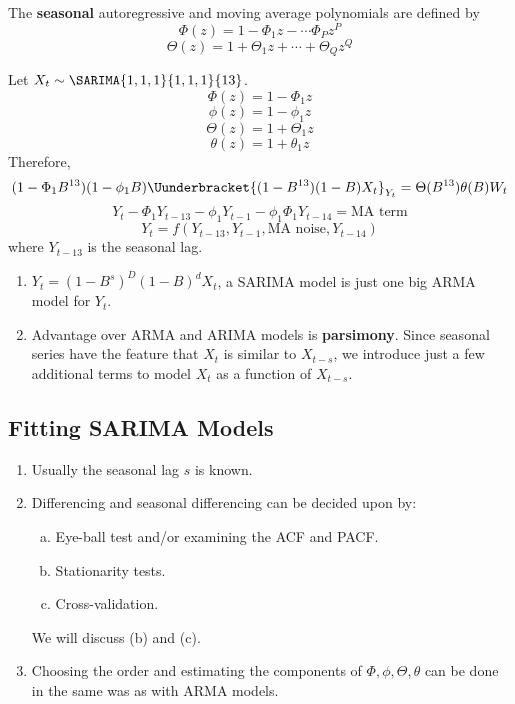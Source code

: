 \begin{Definition}{}{}
      The \textbf{seasonal} autoregressive and moving average polynomials are
      defined by
      \[ \Phi(z)=1-\Phi_1 z-\cdots \Phi_P z^P \]
      \[ \Theta(z)=1+\Theta_1 z+\cdots+\Theta_Q z^Q \]
\end{Definition}
\begin{Example}{}{}
      Let $ X_t \sim \SARIMA{1,1,1}{1,1,1}{13} $.
      \[ \Phi(z)=1-\Phi_1 z \]
      \[ \phi(z)=1-\phi_1 z \]
      \[ \Theta(z)=1+\Theta_1 z \]
      \[ \theta(z)=1+\theta_1 z \]
      Therefore,
      \[ (1-\Phi_1 B^{13})(1-\phi_1 B)\Uunderbracket{(1-B^{13})(1-B)X_t}_{Y_t}=\Theta(B^{13})\theta(B)W_t \]
      \[ Y_t-\Phi_1 Y_{t-13}-\phi_1 Y_{t-1}-\phi_1 \Phi_1 Y_{t-14}=\text{MA term} \]
      \[ Y_t=f(Y_{t-13},Y_{t-1},\text{MA noise}, Y_{t-14}) \]
      where $ Y_{t-13} $ is the seasonal lag.
\end{Example}
\begin{Remark}{}{}
      \begin{enumerate}[(1)]
            \item $ Y_t=(1-B^s)^D(1-B)^d X_t $, a SARIMA model is just one big ARMA
                  model for $ Y_t $.
            \item Advantage over ARMA and ARIMA models is \textbf{parsimony}.
                  Since seasonal series have the feature that $ X_t $ is similar to $ X_{t-s} $,
                  we introduce just a few additional terms to model $ X_t $ as a function of
                  $ X_{t-s} $.
      \end{enumerate}
\end{Remark}
\subsection*{Fitting SARIMA Models}
\begin{enumerate}[(1)]
      \item Usually the seasonal lag $ s $ is known.
      \item Differencing and seasonal differencing can be decided upon by:
            \begin{enumerate}[(a)]
                  \item Eye-ball test and/or examining the ACF and PACF\@.
                  \item Stationarity tests.
                  \item Cross-validation.
            \end{enumerate}
            {\color{blue}We will discuss (b) and (c).}
      \item Choosing the order and estimating the components of $ \Phi,\phi,\Theta,\theta $
            can be done in the same was as with ARMA models.
\end{enumerate}

